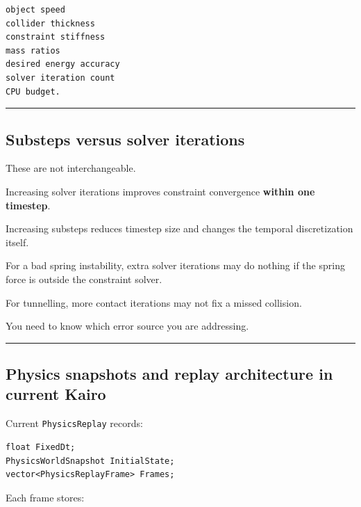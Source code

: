 \begin{verbatim}
object speed
collider thickness
constraint stiffness
mass ratios
desired energy accuracy
solver iteration count
CPU budget.
\end{verbatim}

\begin{center}\rule{0.5\linewidth}{0.5pt}\end{center}

\subsection{Substeps versus solver iterations}\label{06-engine-ii-ch038-substeps-versus-solver-iterations}

\hypertarget{06-engine-ii-ch038-substeps-versus-solver-iterations}{}

These are not interchangeable.

Increasing solver iterations improves constraint convergence \textbf{within one timestep}.

Increasing substeps reduces timestep size and changes the temporal discretization itself.

For a bad spring instability, extra solver iterations may do nothing if the spring force is outside the constraint solver.

For tunnelling, more contact iterations may not fix a missed collision.

You need to know which error source you are addressing.

\begin{center}\rule{0.5\linewidth}{0.5pt}\end{center}

\subsection{Physics snapshots and replay architecture in current Kairo}\label{06-engine-ii-ch038-physics-snapshots-and-replay-architecture-in-current-kairo}

\hypertarget{06-engine-ii-ch038-physics-snapshots-and-replay-architecture-in-current-kairo}{}

Current \texttt{PhysicsReplay} records:

\begin{verbatim}
float FixedDt;
PhysicsWorldSnapshot InitialState;
vector<PhysicsReplayFrame> Frames;
\end{verbatim}

Each frame stores:

